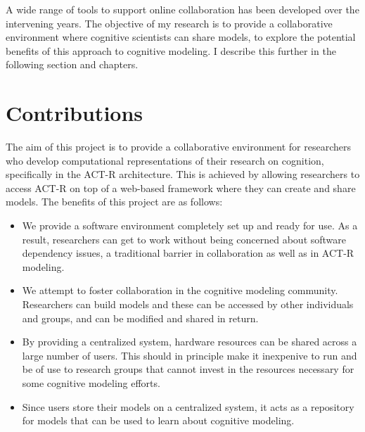 A wide range of tools to support online collaboration has been
developed over the intervening years.
%
%
The objective of my research is to provide a collaborative environment
where cognitive scientists can share models, to explore the potential
benefits of this approach to cognitive modeling.  I describe this
further in the following section and chapters.

\section{Contributions}

The aim of this project is to provide a collaborative environment for
researchers who develop computational representations of their
research on cognition, specifically in the ACT-R architecture.  This
is achieved by allowing researchers to access ACT-R on top of a
web-based framework where they can create and share models.  The
benefits of this project are as follows:

\begin{itemize}
\item We provide a software environment completely set up and ready
  for use. As a result, researchers can get to work without being
  concerned about software dependency issues, a traditional barrier in
  collaboration as well as in ACT-R modeling.
\item We attempt to foster collaboration in the cognitive modeling
  community. Researchers can build models and these can be accessed by
  other individuals and groups, and can be modified and shared in
  return.
\item By providing a centralized system, hardware resources can be
  shared across a large number of users. This should in principle make
  it inexpenive to run and be of use to research groups that cannot
  invest in the resources necessary for some cognitive modeling efforts.
\item Since users store their models on a centralized system, it acts
  as a repository for models that can be used to learn about cognitive
  modeling.
\end{itemize}


